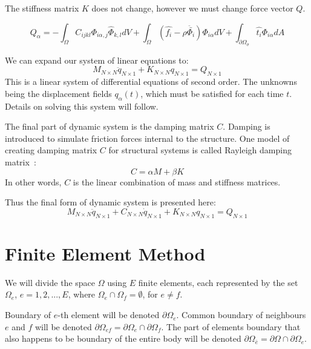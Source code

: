 \documentclass[en]{minipw} %
\begin{document}
The stiffness matrix $K$ does not change, however we must change force vector $Q$.

\begin{equation}
Q_{\alpha} = - \int_{\Omega} C_{ijkl} \Phi_{i \alpha,j} \hat{\Phi}_{k,l} dV + \int_{\Omega} (\hat{f_i} - \rho \ddot{\bar{\Phi_i}} ) \Phi_{i \alpha} dV + \int_{\partial \Omega_{\sigma}} \hat{t_i}\Phi_{i \alpha} dA
\end{equation}

We can expand our system of linear equations to:
\begin{equation}
\label{eq:fem_system}
M_{N \times N}\ddot{q}_{N \times 1} + K_{N \times N} q_{N \times 1} = Q_{N \times 1}
\end{equation}
This is a linear system of differential equations of second order. The unknowns being the displacement fields $q_{\alpha}(t)$, which must be satisfied for each time $t$. Details on solving this system will follow.

The final part of dynamic system is the damping matrix $C$. Damping is introduced to simulate friction forces internal to the structure. One model of creating damping matrix $C$ for structural systems is called Rayleigh damping matrix~\cite{damping}:
\begin{equation}
\label{eq:damping_matrix}
C = \alpha M + \beta K
\end{equation}
In other words, $C$ is the linear combination of mass and stiffness matrices.

Thus the final form of dynamic system is presented here:
\begin{equation}
\label{eq:fem_system_damping}
M_{N \times N}\ddot{q}_{N \times 1} + C_{N \times N}\dot{q}_{N \times 1} + K_{N \times N} q_{N \times 1} = Q_{N \times 1}
\end{equation}

\section{Finite Element Method}
We will divide the space $\Omega$ using $E$ finite elements, each represented by the set $\Omega_{e}$, $e = 1,2,...,E$, where $\Omega_{e} \cap \Omega_{f} = \emptyset$, for $e \neq f$.

Boundary of $e$-th element will be denoted $\partial \Omega_{e}$. Common boundary of neighbours $e$ and $f$ will be denoted $\partial \Omega_{ef} = \partial \Omega_e \cap \partial \Omega_f$. The part of elements boundary that also happens to be boundary of the entire body will be denoted $\partial \Omega_{\bar{e}} = \partial \Omega \cap \partial \Omega_{e}$.
\end{document}
